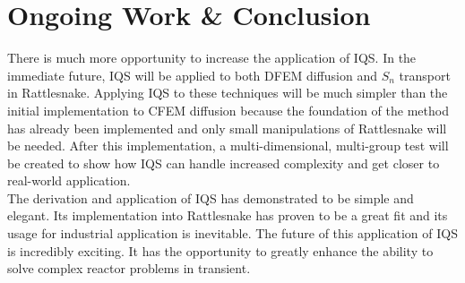 \documentclass[11pt]{scrartcl}
\begin{document}
\section{Ongoing Work \& Conclusion}
There is much more opportunity to increase the application of IQS.  In the immediate future, IQS will be applied to both DFEM diffusion and $S_n$ transport in Rattlesnake.  Applying IQS to these techniques will be much simpler than the initial implementation to CFEM diffusion because the foundation of the method has already been implemented and only small manipulations of Rattlesnake will be needed.  After this implementation, a multi-dimensional, multi-group test will be created to show how IQS can handle increased complexity and get closer to real-world application.
\\
The derivation and application of IQS has demonstrated to be simple and elegant.  Its implementation into Rattlesnake has proven to be a great fit and its usage for industrial application is inevitable.  The future of this application of IQS is incredibly exciting.  It has the opportunity to greatly enhance the ability to solve complex reactor problems in transient.
\end{document}
